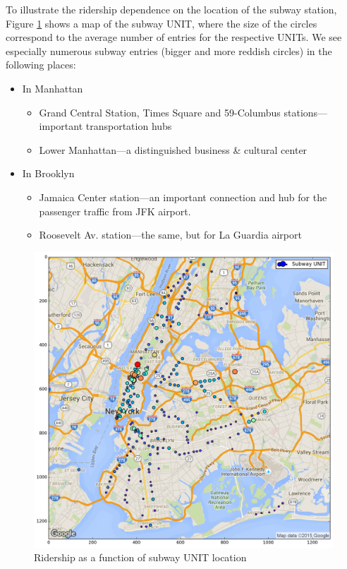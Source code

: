 \documentclass{article}
\begin{document}
To illustrate the ridership dependence on the location of the subway station, Figure \ref{fig:ridership-per-station} shows a map of the subway UNIT, where the size of the circles correspond to the average number of entries for the respective UNITs. We see especially numerous subway entries (bigger and more reddish circles)  in the following places:
\begin{itemize}
\item In Manhattan
\begin{itemize}
\item Grand Central Station, Times Square and 59-Columbus stations---important transportation hubs
\item Lower Manhattan---a distinguished business \& cultural center
 \end{itemize}
\item In Brooklyn
\begin{itemize}
\item Jamaica Center station---an important connection and hub for the passenger traffic from JFK airport.
\item Roosevelt Av. station---the same, but for La Guardia airport
 
\end{itemize}
\end{itemize}

\begin{figure}[ht]
\centering
\includegraphics[scale=0.6]{map_stations_entry.png}
\caption{Ridership as a function of subway UNIT location}
\label{fig:ridership-per-station}
\end{figure}
\end{document}

